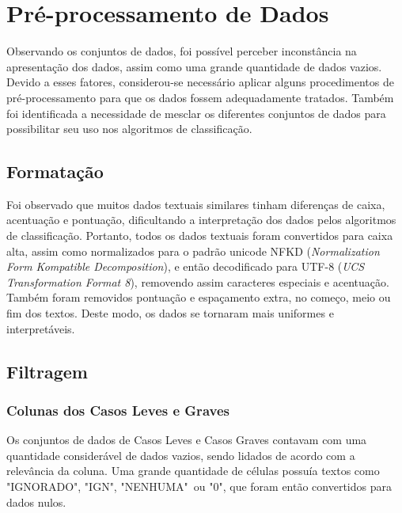 \section{Pré-processamento de Dados}
\label{sec:preprocessamento}

Observando os conjuntos de dados, foi possível perceber inconstância na apresentação dos dados, assim como uma grande quantidade de dados vazios.
Devido a esses fatores, considerou-se necessário aplicar alguns procedimentos de pré-processamento para que os dados fossem adequadamente tratados.
Também foi identificada a necessidade de mesclar os diferentes conjuntos de dados para possibilitar seu uso nos algoritmos de classificação.

\subsection{Formatação}
\label{subsec:formatação}

Foi observado que muitos dados textuais similares tinham diferenças de caixa, acentuação e pontuação, dificultando a interpretação dos dados pelos algoritmos de classificação.
Portanto, todos os dados textuais foram convertidos para caixa alta, assim como normalizados para o padrão unicode NFKD (\textit{Normalization Form Kompatible Decomposition}), e então decodificado para UTF-8 (\textit{UCS Transformation Format 8}), removendo assim caracteres especiais e acentuação.
Também foram removidos pontuação e espaçamento extra, no começo, meio ou fim dos textos.
Deste modo, os dados se tornaram mais uniformes e interpretáveis.

\subsection{Filtragem}
\label{subsec:filtragem}

\subsubsection{Colunas dos Casos Leves e Graves}
\label{subsubsec:casos-filtragem}

Os conjuntos de dados de Casos Leves e Casos Graves contavam com uma quantidade considerável de dados vazios, sendo lidados de acordo com a relevância da coluna.
Uma grande quantidade de células possuía textos como "IGNORADO", "IGN", "NENHUMA"\ ou "0", que foram então convertidos para dados nulos.

